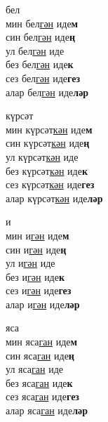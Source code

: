 \begin{multicols}{4}
\begin{enumerate}
\begin{minipage}{\linewidth}
    \item
    бел\\
    мин бел\underline{гән} иде\textbf{м}\\
    син бел\underline{гән} иде\textbf{ң}\\
    ул бел\underline{гән} иде\\
    без бел\underline{гән} иде\textbf{к}\\
    сез бел\underline{гән} иде\textbf{гез}\\
    алар бел\underline{гән} иде\textbf{ләр}\\
\end{minipage}

\begin{minipage}{\linewidth}
    \item
    күрсәт\\
    мин күрсәт\underline{кән} иде\textbf{м}\\
    син күрсәт\underline{кән} иде\textbf{ң}\\
    ул күрсәт\underline{кән} иде\\
    без күрсәт\underline{кән} иде\textbf{к}\\
    сез күрсәт\underline{кән} иде\textbf{гез}\\
    алар күрсәт\underline{кән} иде\textbf{ләр}\\
\end{minipage}

\begin{minipage}{\linewidth}
    \item
    и\\
    мин и\underline{гән} иде\textbf{м}\\
    син и\underline{гән} иде\textbf{ң}\\
    ул и\underline{гән} иде\\
    без и\underline{гән} иде\textbf{к}\\
    сез и\underline{гән} иде\textbf{гез}\\
    алар и\underline{гән} иде\textbf{ләр}\\
\end{minipage}

\begin{minipage}{\linewidth}
    \item
    яса\\
    мин яса\underline{ган} иде\textbf{м}\\
    син яса\underline{ган} иде\textbf{ң}\\
    ул яса\underline{ган} иде\\
    без яса\underline{ган} иде\textbf{к}\\
    сез яса\underline{ган} иде\textbf{гез}\\
    алар яса\underline{ган} иде\textbf{ләр}\\
\end{minipage}


\end{enumerate}
\end{multicols}
